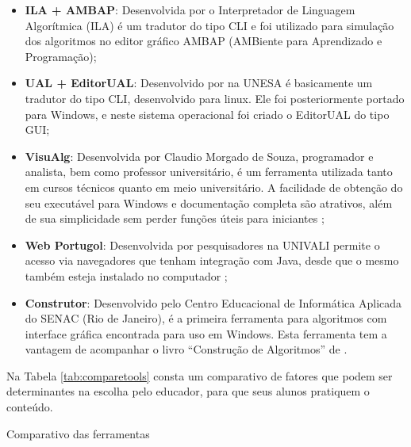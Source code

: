 \begin{itemize}

\item \textbf{ILA + AMBAP}: Desenvolvida por  o Interpretador de Linguagem Algorítmica (ILA) é um tradutor do tipo CLI e foi utilizado para simulação dos algoritmos no editor gráfico AMBAP (AMBiente para Aprendizado e Programação);

\item \textbf{UAL + EditorUAL}: Desenvolvido por  na UNESA é basicamente um tradutor do tipo CLI, desenvolvido para linux. Ele foi posteriormente portado para Windows, e neste sistema operacional foi criado o EditorUAL do tipo GUI;

\item \textbf{VisuAlg}: Desenvolvida por Claudio Morgado de Souza, programador e analista, bem como professor universitário, é um ferramenta utilizada tanto em cursos técnicos quanto em meio universitário. A facilidade de obtenção do seu executável para Windows e documentação completa são atrativos, além de sua  simplicidade sem perder funções úteis para iniciantes \cite{souza2013etal};

\item \textbf{Web Portugol}: Desenvolvida por pesquisadores na UNIVALI permite o acesso via navegadores que tenham integração com Java, desde que o mesmo também esteja instalado no computador \cite{souza2013etal};

\item \textbf{Construtor}: Desenvolvido pelo Centro Educacional de Informática Aplicada do SENAC (Rio de Janeiro), é a primeira ferramenta para algoritmos com interface gráfica encontrada para uso em Windows. Esta ferramenta tem a vantagem de acompanhar o livro ``Construção de Algoritmos'' de .

\end{itemize}

Na Tabela \ref{tab:comparetools} consta um comparativo de fatores que podem ser determinantes na escolha pelo educador, para que seus alunos pratiquem o conteúdo.

\begin{table}[h]
\centering
\caption{Comparativo das ferramentas}\label{tab:comparetools}
  \caption*{\footnotesize Fonte: Produção do autor, 2016.}
\end{table}

